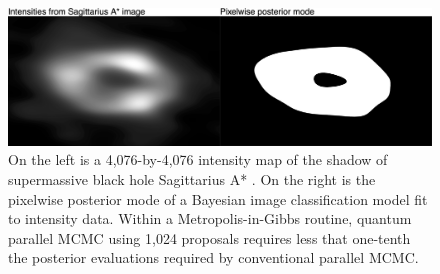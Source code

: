 \documentclass[12pt]{article}
\begin{document}
\setcounter{figure}{7}
 \begin{figure}[!t]
	\centering
	\includegraphics[width=0.9\linewidth]{figures/blackHole.png}
	\caption{On the left is a 4,076-by-4,076 intensity map of the shadow of supermassive black hole Sagittarius A*  \citep{akiyama2022first}.  On the right is the pixelwise posterior mode of a Bayesian image classification model fit to intensity data.  Within a Metropolis-in-Gibbs routine, quantum parallel MCMC using 1,024 proposals requires less that one-tenth the posterior evaluations required by conventional parallel MCMC.}\label{fig:blackHole}
\end{figure}
\end{document}
